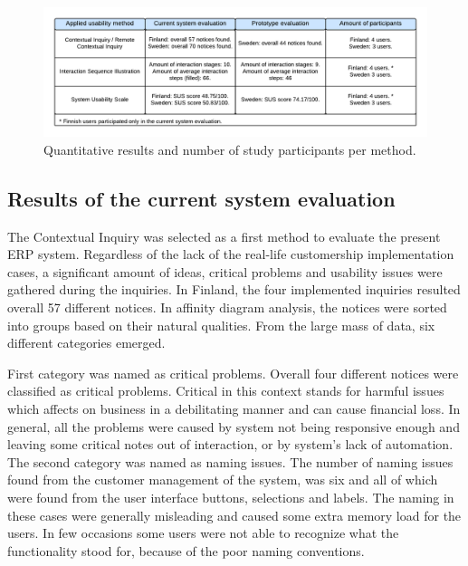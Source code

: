 \documentclass[12pt,a4paper,oneside,pdftex]{report}
\begin{document}
\begin{figure}[H]
  	\centerline{
    	   \includegraphics[width=1.3\textwidth]{./images/methodresult.png}
    	   }
  	   \caption{Quantitative results and number of study participants per method.}
	   \label{fig:methodresults}
\end{figure}

\subsection{Results of the current system evaluation}

The Contextual Inquiry was selected as a first method to evaluate the present ERP system. Regardless of the lack of the real-life customership implementation cases, a significant amount of ideas, critical problems and usability issues were gathered during the inquiries. 
In Finland, the four implemented inquiries resulted overall 57 different notices. In affinity diagram analysis, the notices were sorted into groups based on their natural qualities. From the large mass of data, six different categories emerged. 

First category was named as critical problems. Overall four different notices were classified as critical problems. Critical in this context stands for harmful issues which affects on business in a debilitating manner and can cause financial loss. In general, all the problems were caused by system not being responsive enough and leaving some critical notes out of interaction, or by system's lack of automation. The second category was named as naming issues. The number of naming issues found from the customer management of the system, was six and all of which were found from the user interface buttons, selections and labels. The naming in these cases were generally misleading and caused some extra memory load for the users. In few occasions some users were not able to recognize what the functionality stood for, because of the poor naming conventions. 
\end{document}
